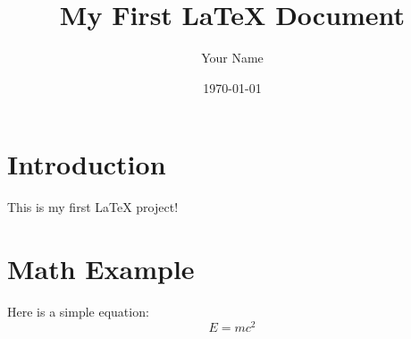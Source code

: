 \documentclass[a4paper,12pt]{article}
\title{My First LaTeX Document}
\author{Your Name}
\date{\today}
\begin{document}
\maketitle

\section{Introduction}
This is my first LaTeX project!

\section{Math Example}
Here is a simple equation:
\begin{equation}
   E = mc^2
\end{equation}
\end{document}
